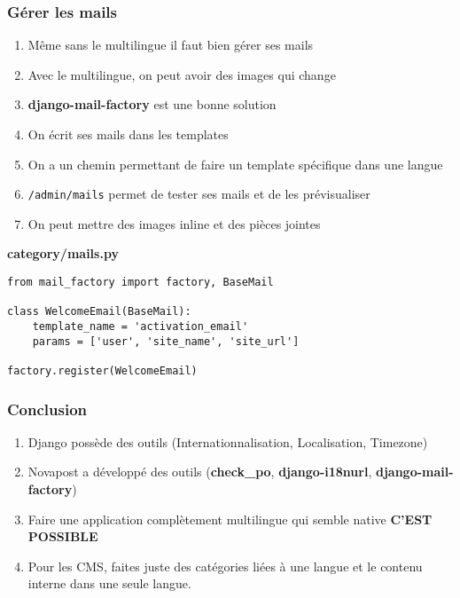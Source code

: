 \documentclass{beamer}
\begin{document}
\begin{frame}[fragile]
  \frametitle{Gérer les mails}
  \vspace{-0.7em}
  \begin{enumerate}
    \item Même sans le multilingue il faut bien gérer ses mails
    \pause \item Avec le multilingue, on peut avoir des images qui change
    \pause \item \textbf{django-mail-factory} est une bonne solution
    \pause \item On écrit ses mails dans les templates
    \pause \item On a un chemin permettant de faire un template spécifique dans une langue
    \pause \item \texttt{/admin/mails} permet de tester ses mails et de les prévisualiser
    \pause \item On peut mettre des images inline et des pièces jointes
  \end{enumerate}
\pause
\textbf{category/mails.py}
\begin{lstlisting}
from mail_factory import factory, BaseMail

class WelcomeEmail(BaseMail):
    template_name = 'activation_email'
    params = ['user', 'site_name', 'site_url']

factory.register(WelcomeEmail)
\end{lstlisting}
\end{frame}



\begin{frame}
  \frametitle{Conclusion}

  \begin{enumerate}
     \item Django possède des outils (Internationnalisation, Localisation, Timezone)
     \pause \item Novapost a développé des outils (\textbf{check\_po}, \textbf{django-i18nurl}, \textbf{django-mail-factory})
     \pause \item Faire une application complètement multilingue qui semble native \pause \textbf{C'EST POSSIBLE}
     \pause \item Pour les CMS, faites juste des catégories liées à une langue et le contenu interne dans une seule langue.
  \end{enumerate}

\end{frame}
\end{document}
